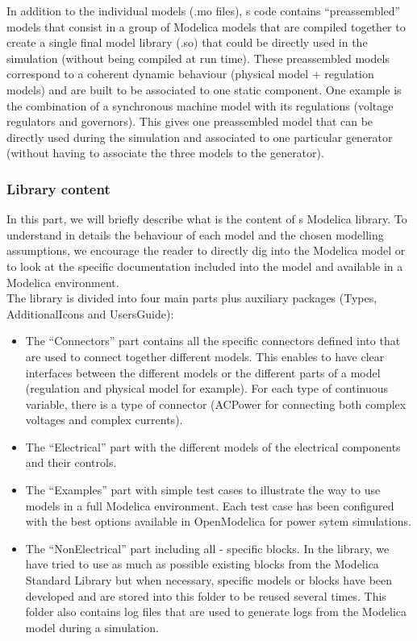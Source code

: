 \documentclass[a4paper, 12pt]{report}
\begin{document}
In addition to the individual models (.mo files), \Dynawo\textquotesingle s code contains ``preassembled'' models that consist in a group of Modelica models that are compiled together to create a single final model library (.so) that could be directly used in the simulation (without being compiled at run time). These preassembled models correspond to a coherent dynamic behaviour (physical model + regulation models) and are built to be associated to one static component. One example is the combination of a synchronous machine model with its regulations (voltage regulators and governors). This gives one preassembled model that can be directly used during the simulation and associated to one particular generator (without having to associate the three models to the generator).

\subsubsection{Library content}

In this part, we will briefly describe what is the content of \Dynawo\textquotesingle s Modelica library. To understand in details the behaviour of each model and the chosen modelling assumptions, we encourage the reader to directly dig into the Modelica  model or to look at the specific documentation included into the model and available in a Modelica environment.\\

The \Dynawo library is divided into four main parts plus auxiliary packages (Types, AdditionalIcons and UsersGuide):
\begin{itemize}
\item The ``Connectors'' part contains all the specific connectors defined into \Dynawo that are used to connect together different models. This enables to have clear interfaces between the different models or the different parts of a model (regulation and physical model for example). For each type of continuous variable, there is a type of connector (ACPower for connecting both complex voltages and complex currents).
\item The ``Electrical'' part with the different models of the electrical components and their controls.
\item The ``Examples'' part with simple test cases to illustrate the way to use \Dynawo models in a full Modelica environment. Each test case has been configured with the best options available in OpenModelica for power sytem simulations.
\item The ``NonElectrical'' part including all \Dynawo - specific blocks. In the library, we have tried to use as much as possible existing blocks from the Modelica Standard Library but when necessary, specific models or blocks have been developed and are stored into this folder to be reused several times. This folder also contains log files that are used to generate logs from the Modelica model during a simulation.
\end{itemize}
\end{document}
